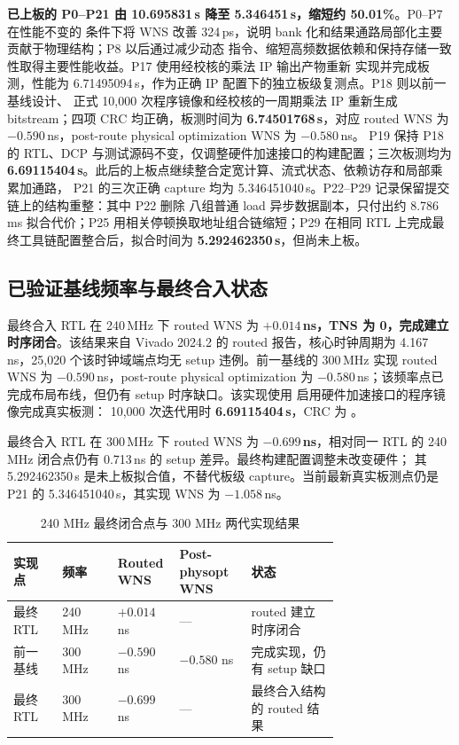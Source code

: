 \textbf{已上板的 P0--P21 由 10.695831\,s 降至 5.346451\,s，缩短约 50.01\%}。P0--P7 在性能不变的
条件下将 WNS 改善 324\,ps，说明 bank 化和结果通路局部化主要贡献于物理结构；P8 以后通过减少动态
指令、缩短高频数据依赖和保持存储一致性取得主要性能收益。P17 使用经校核的乘法 IP 输出产物重新
实现并完成板测，性能为 6.71495094\,s，作为正确 IP 配置下的独立板级复测点。P18 则以前一基线设计、
正式 10,000 次程序镜像和经校核的一周期乘法 IP 重新生成 bitstream；四项 CRC 均正确，板测时间为
\textbf{6.74501768\,s}，对应 routed WNS 为 $-0.590$\,ns，post-route physical optimization WNS 为 $-0.580$\,ns。
P19 保持 P18 的 RTL、DCP 与测试源码不变，仅调整硬件加速接口的构建配置；三次板测均为
\textbf{6.69115404\,s}。此后的上板点继续整合定宽计算、流式状态、依赖访存和局部乘累加通路，
P21 的三次正确 capture 均为 5.346451040\,s。P22--P29 记录保留提交链上的结构重整：其中 P22 删除
八组普通 load 异步数据副本，只付出约 8.786\,ms 拟合代价；P25 用相关停顿换取地址组合链缩短；P29
在相同 RTL 上完成最终工具链配置整合后，拟合时间为 \textbf{5.292462350\,s}，但尚未上板。

\subsection{已验证基线频率与最终合入状态}\label{sec:timing}

最终合入 RTL 在 240\,MHz 下 routed WNS 为
\textbf{$+0.014$\,ns，TNS 为 0，完成建立时序闭合}。该结果来自 Vivado 2024.2
的  routed 报告，核心时钟周期为 4.167\,ns，25,020 个该时钟域端点均无
setup 违例。前一基线的 300\,MHz 实现 routed WNS 为 $-0.590$\,ns，post-route physical optimization
为 $-0.580$\,ns；该频率点已完成布局布线，但仍有 setup 时序缺口。该实现使用
启用硬件加速接口的程序镜像完成真实板测：
10,000 次迭代用时 \textbf{6.69115404\,s}，CRC 为 。

最终合入 RTL 在 300\,MHz 下 routed WNS 为 \textbf{$-0.699$\,ns}，相对同一
RTL 的 240\,MHz 闭合点仍有 0.713\,ns 的 setup 差异。最终构建配置调整未改变硬件；
其 5.292462350\,s 是未上板拟合值，不替代板级 capture。当前最新真实板测点仍是 P21 的
5.346451040\,s，其实现 WNS 为 $-1.058$\,ns。

\begin{table}[H]\centering
\caption{240 MHz 最终闭合点与 300 MHz 两代实现结果}
\small
\begin{tabularx}{\linewidth}{@{}C{0.15\linewidth}C{0.17\linewidth}C{0.19\linewidth}C{0.22\linewidth}Y@{}}\toprule
\textbf{实现点}&\textbf{频率}&\textbf{Routed WNS}&\textbf{Post-physopt WNS}&\textbf{状态}\\\midrule
最终 RTL&240 MHz&$+0.014$ ns&---&routed 建立时序闭合\\
前一基线&300 MHz&$-0.590$ ns&$-0.580$ ns&完成实现，仍有 setup 缺口\\
最终 RTL&300 MHz&$-0.699$ ns&---&最终合入结构的 routed 结果\\
\bottomrule\end{tabularx}
\end{table}

